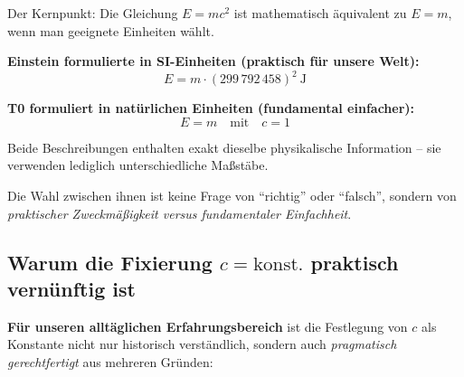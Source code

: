 	\begin{tcolorbox}[colback=blue!10!white,colframe=blue!75!black,title=Die pragmatische Perspektive: Einheitensysteme und Konventionen]
		Der Kernpunkt: Die Gleichung \( E = mc^2 \) ist mathematisch äquivalent zu \( E = m \), wenn man geeignete Einheiten wählt.
		
		\textbf{Einstein formulierte in SI-Einheiten (praktisch für unsere Welt):}
		\begin{equation}
			E = m \cdot (299\,792\,458)^2 \ \text{J} 
		\end{equation}
		
		\textbf{T0 formuliert in natürlichen Einheiten (fundamental einfacher):}
		\begin{equation}
			E = m \quad \text{mit} \quad c = 1
		\end{equation}
		
		Beide Beschreibungen enthalten exakt dieselbe physikalische Information – sie verwenden lediglich unterschiedliche Maßstäbe.
		
		Die Wahl zwischen ihnen ist keine Frage von ``richtig'' oder ``falsch'', sondern von \textit{praktischer Zweckmäßigkeit versus fundamentaler Einfachheit}.
	\end{tcolorbox}
	
	\subsection{Warum die Fixierung \( c = \text{konst.} \) praktisch vernünftig ist}
	
	\textbf{Für unseren alltäglichen Erfahrungsbereich} ist die Festlegung von \( c \) als Konstante nicht nur historisch verständlich, sondern auch \textit{pragmatisch gerechtfertigt} aus mehreren Gründen:
	
